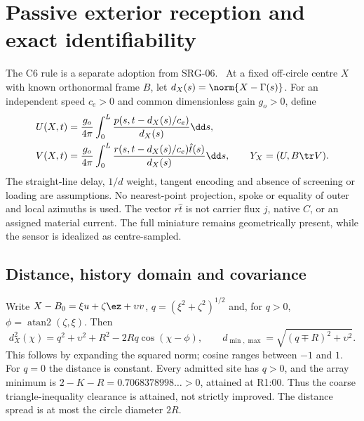 \section{Passive exterior reception and exact identifiability}\label{sec:exterior}
The C6 rule is a separate adoption from SRG-06.~\cite{SRG06} At a fixed off-circle centre $X$ with known orthonormal frame $B$, let $d_X(s)=\norm{X-\Gamma(s)}$. For an independent speed $c_e>0$ and common dimensionless gain $g_o>0$, define
\begin{equation}\label{eq:C6}
 \begin{aligned}
 U(X,t)&=\frac{g_o}{4\pi}\int_0^L\frac{p(s,t-d_X(s)/c_e)}{d_X(s)}\dd s,\\
 V(X,t)&=\frac{g_o}{4\pi}\int_0^L\frac{r(s,t-d_X(s)/c_e)\hat t(s)}{d_X(s)}\dd s,\qquad
 Y_X=(U,B\tr V).
 \end{aligned}
\end{equation}
The straight-line delay, $1/d$ weight, tangent encoding and absence of screening or loading are assumptions. No nearest-point projection, spoke or equality of outer and local azimuths is used. The vector $r\hat t$ is not carrier flux $j$, native $C$, or an assigned material current. The full miniature remains geometrically present, while the sensor is idealized as centre-sampled.

\subsection{Distance, history domain and covariance}
Write $X-B_0=\xi u+\zeta\ez+\upsilon v$, $q=(\xi^2+\zeta^2)^{1/2}$ and, for $q>0$, $\phi=\operatorname{atan2}(\zeta,\xi)$. Then
\begin{equation}\label{eq:distance}
 d_X^2(\chi)=q^2+\upsilon^2+R^2-2Rq\cos(\chi-\phi),\qquad
 d_{\min,\max}=\sqrt{(q\mp R)^2+\upsilon^2}.
\end{equation}
This follows by expanding the squared norm; cosine ranges between $-1$ and $1$. For $q=0$ the distance is constant. Every admitted site has $q>0$, and the array minimum is $2-K-R=0.7068378998\ldots>0$, attained at R1:00. Thus the coarse triangle-inequality clearance is attained, not strictly improved. The distance spread is at most the circle diameter $2R$.

